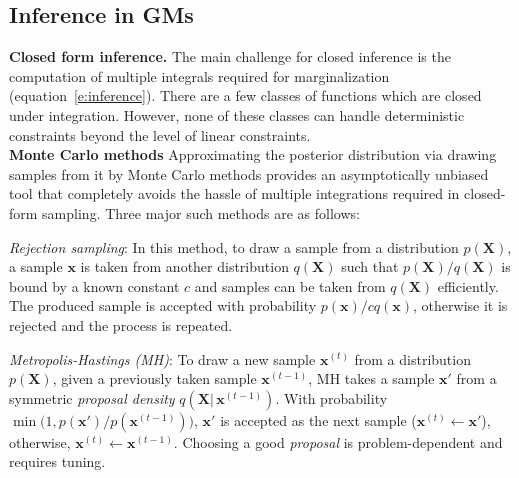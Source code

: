 \documentclass[letterpaper]{article}
\newcommand{\bvec}[1]{\textbf{#1}}
\newcommand{\pr}{p}
\begin{document}
\subsection{Inference in GMs}
\textbf{Closed form inference.}
The main challenge for closed inference is the computation of multiple integrals required for marginalization (equation~\ref{e:inference}).
There are a few classes of functions which are closed under integration.
However, none of these classes can handle deterministic constraints beyond the level of linear constraints.
\\
\textbf{Monte Carlo methods}
Approximating the posterior distribution via drawing samples from it by Monte Carlo methods 
provides an asymptotically unbiased tool that completely avoids the hassle of multiple integrations required in closed-form sampling.   
Three major such methods are as follows:

\emph{Rejection sampling}: In this method, to draw a sample from 
a distribution $p(\bvec{X})$, a sample $\bvec{x}$ is taken from another distribution $q(\bvec{X})$
such that $p(\bvec{X})/q(\bvec{X})$ is bound by a known constant $c$
and samples can be taken from $q(\bvec{X})$ efficiently.
The produced sample is accepted with probability $p(\bvec{x}) / c q(\bvec{x})$, 
otherwise it is rejected and the process is repeated. 

\emph{Metropolis-Hastings (MH)}:
To draw a new sample $\bvec{x}^{(t)}$ from a distribution $p(\bvec{X})$, given a previously taken sample $\bvec{x}^{(t-1)}$, 
MH takes a sample $\bvec{x}'$ from a symmetric \emph{proposal density} $q(\bvec{X} |\, \bvec{x}^{(t-1)})$. 
With probability $\min \big(1, p(\bvec{x}')/p(\bvec{x}^{(t-1)}) \big)$, 
$\bvec{x}'$ is accepted as the next sample ($\bvec{x}^{(t)} \leftarrow \bvec{x}'$), otherwise, $\bvec{x}^{(t)} \leftarrow \bvec{x}^{(t-1)}$. 
Choosing a good \emph{proposal} is problem-dependent and requires tuning. 
\end{document}
